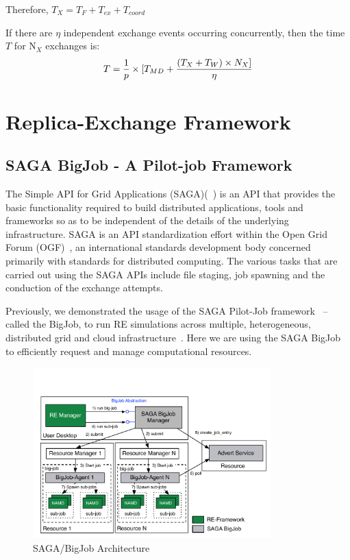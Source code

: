 \documentclass{rspublic}
\begin{document}
Therefore, ${T_{X}} = {T_F + T_{ex} + T_{coord}}$ 

If there are $\eta$ independent exchange events occurring
concurrently, then the time $T$ for N$_X$ exchanges is:
\begin{eqnarray}
T = {1\over p} \times [T_{MD}+ {(T_{X} + T_{W}) \times N_X]\over \eta}
\label{eq:totaltime}
\end{eqnarray}

\section{Replica-Exchange Framework}

\subsection{SAGA BigJob - A Pilot-job Framework}
\label{sec:BigJob}

The Simple API for Grid Applications (SAGA)(~\citep{saga_gfd90}) is an API that provides the basic functionality required to build distributed applications, tools and frameworks so as to be independent of the details of the underlying infrastructure. SAGA is an API standardization effort within the Open Grid Forum (OGF)~\citep{ogf_web}, an international standards development body concerned primarily with standards for distributed computing. The various tasks that are carried out using the SAGA APIs include file staging, job spawning and the conduction of the exchange attempts.

Previously, we demonstrated the usage of the SAGA Pilot-Job framework~\citep{saga_bigjob_condor_cloud} -- called the BigJob, to run RE simulations across multiple, heterogeneous, distributed grid and cloud infrastructure~\citep{Luckow:2008fp}. Here we are using the SAGA BigJob to efficiently request and manage computational resources. 

\begin{figure}[t]
      \centering
          \includegraphics[width=0.82\textwidth]{../figures/Bigjob_arch.pdf}
          \caption{\footnotesize SAGA/BigJob Architecture
              }
      \label{fig:bigjob}
\end{figure}
\end{document}
